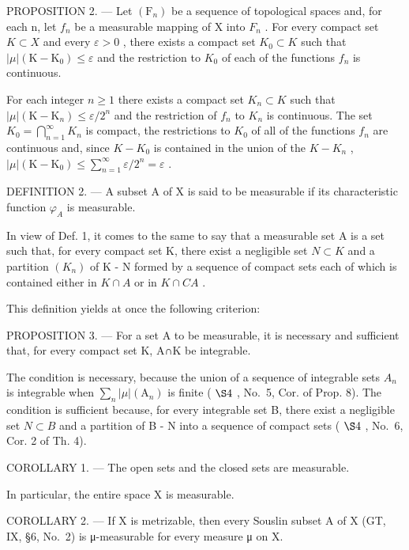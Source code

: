 PROPOSITION 2. --- Let \((\mathrm{F}_{n})\) be a sequence of topological spaces and, for each n, let \(f_{n}\) be a measurable mapping of X into \(F_{n}\) . For every compact set \(K \subset X\) and every \(\varepsilon > 0\) , there exists a compact set \(K_{0} \subset K\) such that \(|\mu|(\mathrm{K} - \mathrm{K}_{0}) \leqslant \varepsilon\) and the restriction to \(K_{0}\) of each of the functions \(f_{n}\) is continuous.

For each integer \(n \geqslant 1\) there exists a compact set \(K_{n} \subset K\) such that \(|\mu|(\mathrm{K} - \mathrm{K}_{n}) \leqslant \varepsilon/2^{n}\) and the restriction of \(f_{n}\) to \(K_{n}\) is continuous. The set \(K_{0} = \bigcap_{n=1}^{\infty} K_{n}\) is compact, the restrictions to \(K_{0}\) of all of the functions \(f_{n}\) are continuous and, since \(K - K_{0}\) is contained in the union of the \(K - K_{n}\) , \(|\mu|(\mathrm{K} - \mathrm{K}_{0}) \leqslant \sum_{n=1}^{\infty} \varepsilon/2^{n} = \varepsilon\) .

DEFINITION 2. --- A subset A of X is said to be measurable if its characteristic function \(\varphi_{A}\) is measurable.

In view of Def. 1, it comes to the same to say that a measurable set A is a set such that, for every compact set K, there exist a negligible set \(N \subset K\) and a partition \((K_{n})\) of K - N formed by a sequence of compact sets each of which is contained either in \(K \cap A\) or in \(K \cap C A\) .

This definition yields at once the following criterion:

PROPOSITION 3. --- For a set A to be measurable, it is necessary and sufficient that, for every compact set K, A∩K be integrable.

The condition is necessary, because the union of a sequence of integrable sets \(A_{n}\) is integrable when \(\sum_{n}|\mu|(\mathrm{A}_{n})\) is finite ( \(\S4\) , No.~5, Cor. of Prop. 8). The condition is sufficient because, for every integrable set B, there exist a negligible set \(N \subset B\) and a partition of B - N into a sequence of compact sets ( \(\S4\) , No.~6, Cor. 2 of Th. 4).

COROLLARY 1. --- The open sets and the closed sets are measurable.

In particular, the entire space \(\mathrm{X}\) is measurable.

COROLLARY 2. --- If X is metrizable, then every Souslin subset A of X (GT, IX, §6, No.~2) is μ-measurable for every measure μ on X.

